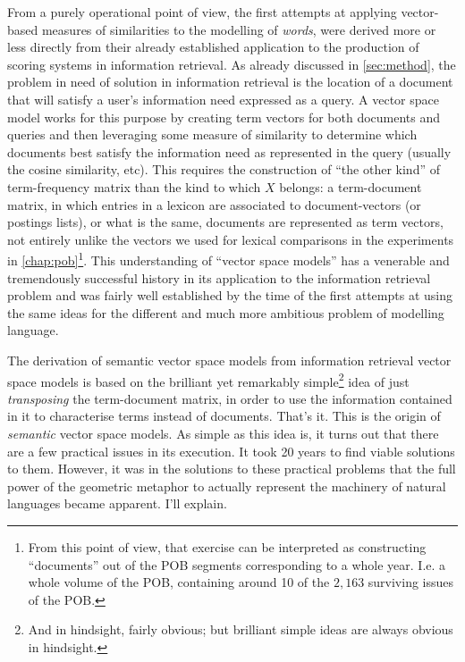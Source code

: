 From a purely operational point of view, the first attempts at applying vector-based measures of similarities to the modelling of \emph{words}, were derived more or less directly from their already established application to the production of scoring systems in information retrieval.
As already discussed in \autoref{sec:method}, the problem in need of solution in information retrieval is the location of a document that will satisfy a user's information need expressed as a query.
A vector space model works for this purpose by creating term vectors for both documents and queries and then leveraging some measure of similarity to determine which documents best satisfy the information need as represented in the query (usually the cosine similarity, etc).
This requires the construction of ``the other kind'' of term-frequency matrix than the kind to which $X$ belongs: a term-document matrix, in which entries in a lexicon are associated to document-vectors (or postings lists), or what is the same, documents are represented as term vectors, not entirely unlike the vectors we used for lexical comparisons in the experiments in \autoref{chap:pob}\footnote{
    From this point of view, that exercise can be interpreted as constructing ``documents'' out of the POB segments corresponding to a whole year.
    I.e. a whole volume of the POB, containing around 10 of the $2,163$ surviving issues of the POB.
}.
This understanding of ``vector space models'' has a venerable and tremendously successful history in its application to the information retrieval problem \citep{salton1975,salton1988,manning2008} and was fairly well established by the time of the first attempts at using the same ideas for the different and much more ambitious problem of modelling language.

The derivation of semantic vector space models from information retrieval vector space models is based on the brilliant yet remarkably simple\footnote{
    And in hindsight, fairly obvious; but brilliant simple ideas are always obvious in hindsight.
} idea of just \emph{transposing} the term-document matrix, in order to use the information contained in it to characterise terms instead of documents.
That's it.
This is the origin of \emph{semantic} vector space models.
As simple as this idea is, it turns out that there are a few practical issues in its execution.
It took 20 years to find viable solutions to them.
However, it was in the solutions to these practical problems that the full power of the geometric metaphor to actually represent the machinery of natural languages became apparent.
I'll explain.

